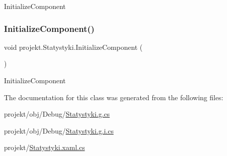 Initialize\+Component 

\mbox{\label{classprojekt_1_1_statystyki_a6f4801d8176e1c715f5260bf055b0915}} 
\subsubsection{\texorpdfstring{Initialize\+Component()}{InitializeComponent()}\hspace{0.1cm}{\footnotesize\ttfamily [9/9]}}
{\footnotesize\ttfamily void projekt.\+Statystyki.\+Initialize\+Component (\begin{DoxyParamCaption}{ }\end{DoxyParamCaption})\hspace{0.3cm}{\ttfamily [inline]}}



Initialize\+Component 



The documentation for this class was generated from the following files\+:\begin{DoxyCompactItemize}
\item 
projekt/obj/\+Debug/\mbox{\hyperlink{_debug_2_statystyki_8g_8cs}{Statystyki.\+g.\+cs}}\item 
projekt/obj/\+Debug/\mbox{\hyperlink{_debug_2_statystyki_8g_8i_8cs}{Statystyki.\+g.\+i.\+cs}}\item 
projekt/\mbox{\hyperlink{_statystyki_8xaml_8cs}{Statystyki.\+xaml.\+cs}}\end{DoxyCompactItemize}
